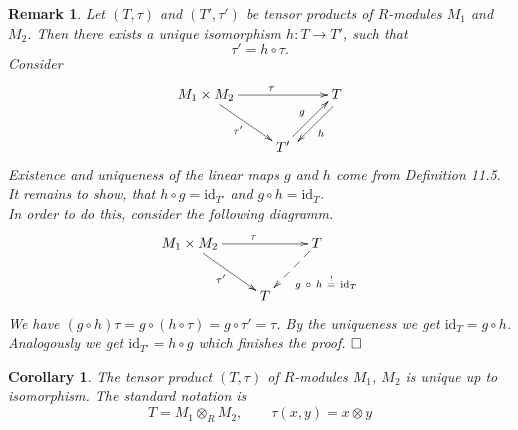 \documentclass[11pt]{book}
\newtheorem{corollary}[theorem]{Corollary}
\newtheorem{remark}[theorem]{Remark}
\theoremstyle{nonumberbreak}
\newenvironment{pr}[1][]{\ifthenelse{\equal{#1}{}}{\proof}{\proof[#1]}\rm}{\endproof}
\begin{document}
\begin{spacing}{1.3}
\begin{remark} %
Let $(T,\tau)$ and $(T', \tau')$ be tensor products of $R$-modules $M_1$ and $M_2$.
Then there exists a unique isomorphism
$h: T \longrightarrow T'$, such that $$\tau'=h \circ \tau.$$
\begin{pr}
Consider
$$\begin{xy}?
\xymatrix{
**[c] M_1 \times M_2 \ar[rr]^{\tau} \ar[rd]_{\tau'} && T \ar@<4pt> [ld]^{h}  \\ & T'  \ar@<1pt>[ru]^g&
}
\end{xy}$$
Existence and uniqueness of the linear maps $g$ and $h$ come from Definition 11.5. It remains to show, that $h \circ g = \textrm{id}_{T'}$ and $g \circ h = \textrm{id}_{T}$.\\
In order to do this, consider the following diagramm.
$$\begin{xy}
\xymatrix{
M_1 \times M_2 \ar[rr]^{\tau} \ar[rd]_{\tau'} && T \ar@{-->}[ld]^{g\ \circ \ h\ \overset{!}{=}\ \textrm{id}_T} \\ & T &
}
\end{xy}$$
We have $(g \circ h) \tau = g \circ ( h \circ \tau )= g \circ \tau'=\tau$. By the uniqueness we get $\textrm{id}_{T}=g \circ h $. Analogously we get $\textrm{id}_{T'}= h \circ g$ which finishes the proof. $\hfill \Box$
\end{pr}
\end{remark}

\begin{corollary}%
The tensor product $(T, \tau)$ of $R$-modules $M_1$, $M_2$ is unique up to isomorphism. The standard notation is
$$T= M_1 \otimes_R M_2, \qquad \tau(x,y)=x \otimes y$$
\end{corollary}


\end{spacing}
\end{document}
